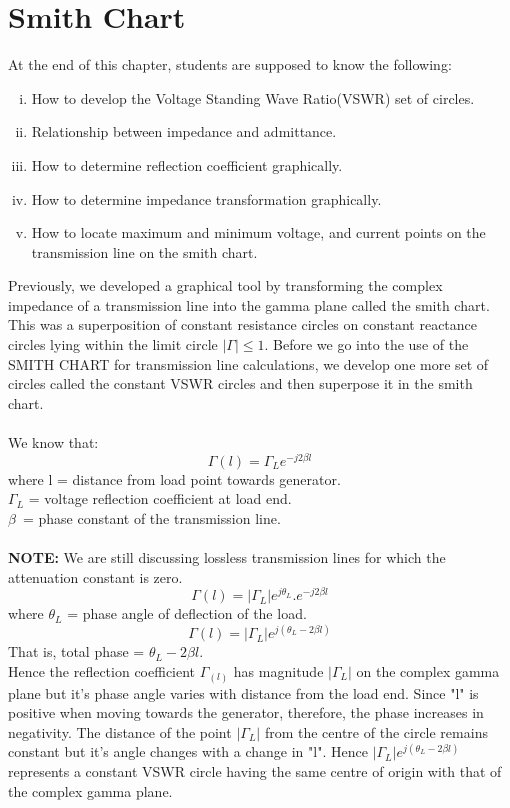 \chapter{Smith Chart}\label{lec:lec8}
At the end of this chapter, students are supposed to know the following:

\begin{enumerate}[(i)]
\item How to develop the Voltage Standing Wave Ratio(VSWR) set of circles.
\item Relationship between impedance and admittance.
\item How to determine reflection coefficient graphically.
\item How to determine impedance transformation graphically.
\item How to locate maximum and minimum voltage, and current points on the transmission line on the smith chart.
\end{enumerate}
Previously, we developed a graphical tool by transforming the complex impedance of a transmission line into the gamma plane called the smith chart. This was a superposition of constant resistance circles on constant reactance circles lying within the limit circle $|\Gamma| \leq 1$. Before we go into the use of the SMITH CHART for transmission line calculations, we develop one more set of circles called the constant VSWR circles and then superpose it in the smith chart.\\\\ We know that:
\begin{equation*}
\Gamma(l) =\Gamma_L e^{-j2\beta{l}}
\end{equation*}
where l = distance from load point towards generator.\\
$\Gamma_{L}$ = voltage reflection coefficient at load end.\\ 	
$\beta$\ = phase constant of the transmission line.\\\\
\textbf{NOTE:}	We are still discussing lossless transmission lines for which the attenuation constant is zero.
\begin{equation*}
\Gamma{(l)}=|\Gamma_{L}|e^{j\theta_L}.e^{-j2\beta l}
\end{equation*}
where	$\theta_L$ = phase angle of deflection of the load.
\begin{equation}
\Gamma{(l)} =|\Gamma_L|e^{j(\theta_L - 2\beta{l})}
\end{equation}
That is, total phase = $\theta_L - 2\beta{l}$.\\
Hence the reflection coefficient $\Gamma_{(l)}$ has magnitude $|\Gamma_L|$ on the complex gamma plane but it's phase angle varies with distance from the load end. Since "l" is positive when moving towards the generator, therefore, the phase increases in negativity. The distance of the point $|\Gamma_L|$ from the centre of the circle remains constant but it's angle changes with a change in "l". Hence $|\Gamma_L|e^{j(\theta_L - 2\beta l)}$ represents a constant VSWR circle having the same centre of origin with that of the complex gamma plane.

